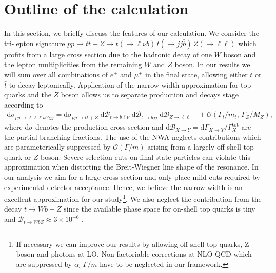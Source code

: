 \documentclass[preprint]{JHEP3} %
\newcommand{\mrm}{\mathrm}
\newcommand{\rd}{\mathrm{d}}
\newcommand{\Br}{\mathcal{B}}
\def\ttb{t\bar{t}}
\newcommand{\be}{\begin{eqnarray}}
\newcommand{\ee}{\end{eqnarray}}
\begin{document}
\section{Outline of the calculation}
In this section, we brielfy discuss the features of our calculation.
We consider the tri-lepton signature  
$pp \to \ttb + Z \to t(\to \ell \nu b) \, \bar{t} (\to jj \bar{b}) \, Z(\to \ell \ell)$
which profits from a large cross section due to the hadronic decay of one $W$ boson and the lepton multiplicities from the remaining $W$ and $Z$ boson.
In our results we will sum over all combinations of $e^\pm$ and $\mu^\pm$ in the final state, allowing either $t$ or $\bar t$ to decay leptonically.
Application of the narrow-width approximation for top quarks and the $Z$ boson allows us to separate production and decays stage according to 
\be
 \rd \sigma_{pp\to\ell\ell\ell\nu b \bar{b} jj} = \rd \sigma_{pp\to\ttb+Z} \; \rd\Br_{t\to b \ell\nu} \; \rd\Br_{\bar{t} \to \bar{b} jj} \; \rd\Br_{Z\to \ell\ell}
 \quad+ \mathcal{O}(\Gamma_t/m_t, \, \Gamma_Z/M_Z)
, \label{Xsec}
\ee
where $\rd \sigma$ denotes the production cross section and $\rd\Br_{X\to Y}= \rd \Gamma_{X\to Y} \big/ \Gamma^\mrm{tot}_X$ are the partial branching fractions.
The use of the NWA neglects contributions which are parameterically suppressed by $\mathcal{O}(\Gamma / m)$ arising from a largely off-shell top quark or $Z$ boson.
Severe selection cuts on final state particles can violate this approximation when distorting the Breit-Wiegner line shape of the resonance.
In our analysis we aim for a large cross section and only place mild cuts required by experimental detector acceptance. 
Hence, we believe the narrow-width is an excellent approximation for our study\footnote{
If necessary we can improve our results by allowing off-shell top quarks, Z boson and photons at LO.
Non-factoriable corrections at NLO QCD which are suppressed by $\alpha_s \, \Gamma/m$ have to be neglected in our framework.
}.
We also neglect the contribution from the decay $t \to Wb+Z$ since the available phase space for on-shell top quarks is tiny and $\Br_{t\to W bZ } \approx 3 \times 10^{-6}$ \cite{see Baur}.
\end{document}
